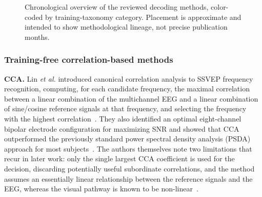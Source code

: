 \documentclass[11pt]{article}
\begin{document}
\begin{figure}[htbp]
{
}
\caption{Chronological overview of the reviewed decoding methods, color-coded by training-taxonomy category. Placement is approximate and intended to show methodological lineage, not precise publication months.}
\label{fig:timeline}
\end{figure}

\subsubsection{Training-free correlation-based methods}

\textbf{CCA.} Lin \textit{et al.} introduced canonical correlation analysis to SSVEP frequency recognition, computing, for each candidate frequency, the maximal correlation between a linear combination of the multichannel EEG and a linear combination of sine/cosine reference signals at that frequency, and selecting the frequency with the highest correlation~\cite{lin2007cca}. They also identified an optimal eight-channel bipolar electrode configuration for maximizing SNR and showed that CCA outperformed the previously standard power spectral density analysis (PSDA) approach for most subjects~\cite{lin2007cca}. The authors themselves note two limitations that recur in later work: only the single largest CCA coefficient is used for the decision, discarding potentially useful subordinate correlations, and the method assumes an essentially linear relationship between the reference signals and the EEG, whereas the visual pathway is known to be non-linear~\cite{lin2007cca}.
\end{document}
